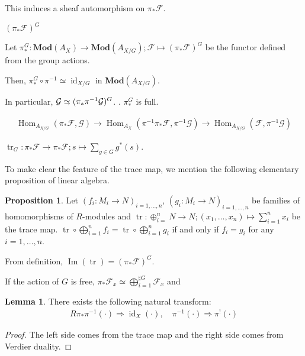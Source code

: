\documentclass[a4paper,dvipdfmx,reqno,12pt]{amsart}
\theoremstyle{definition}
\newtheorem{Prop}[Thm]{Proposition}
\newtheorem{Lem}[Thm]{Lemma}
\newcommand{\mcal}[1]{\mathcal{#1}}%
\newcommand{\opn}[1]{\operatorname{#1}}
\newcommand{\catn}[1]{\mathbf{#1}}
\newcommand{\simto}{ 
\mathrel{\raisebox{0.13em}{${\sim}$}}
\kern -0.75em \mathrel{\raisebox{-0.11em}{${\scriptstyle \to}$}}  
}
\numberwithin{equation}{section}
\begin{document}
This induces a sheaf automorphism on $\pi_*\mcal{F}$.

$(\pi_*\mcal{F})^{G}$


Let $\pi_{*}^{G}: \catn{Mod}(A_X)\to \catn{Mod}(A_{X/G});
  \mcal{F}\mapsto (\pi_*\mcal{F})^{G}$
be the functor defined from the group actions.

Then, $\pi_*^{G}\circ \pi^{-1}\simeq \opn{id}_{X/G}$
in  $\catn{Mod}(A_{X/G})$.





In particular, $\mcal{G}\simto(\pi_*\pi^{-1}\mcal{G})^{G}$.
\cite[Theorem 19.1]{bredonSheafTheory1997a}.
$\pi_*^{G}$ is full.



\begin{align}
  \opn{Hom}_{A_{X/G}}(\pi_*\mcal{F},\mcal{G})\to
  \opn{Hom}_{A_{X}}(\pi^{-1}\pi_*\mcal{F},\pi^{-1}\mcal{G}) \to
  \opn{Hom}_{A_{X/G}}(\mcal{F},\pi^{-1}\mcal{G})
\end{align}

$\opn{tr}_{G}:\pi_*\mcal{F}\to \pi_*\mcal{F};
  s \mapsto \sum_{g\in G}g^{*}(s)$.

To make clear the feature of the trace map, we mention the
following elementary proposition of linear algebra.

\begin{Prop}
  Let $(f_i:M_i \to N)_{i=1,\ldots,n}$,
  $(g_i:M_i \to N)_{i=1,\ldots,n}$ be families of
  homomorphisms of
  $R$-modules and $\opn{tr}:\oplus_{i=}^{n}N \to N;
    (x_1,\ldots,x_n)\mapsto \sum_{i=1}^{n}x_i$ be the trace map.
  $\opn{tr}\circ \bigoplus_{i=1}^{n} f_i=\opn{tr}\circ \bigoplus_{i=1}^{n}g_i$ if
  and only if $f_i=g_i$ for any $i=1,\ldots,n$.
\end{Prop}


From definition, $\opn{Im}(\opn{tr})=(\pi_*\mcal{F})^{G}$.


If the action of $G$ is free,
$\pi_*\mcal{F}_x\simeq \bigoplus_{i=1}^{\sharp G}\mcal{F}_x$
and

\begin{Lem}
  There exists the following natural transform:
  \begin{align}
    R\pi_*\pi^{-1}(\cdot)\Rightarrow \opn{id}_X(\cdot),\quad
    \pi^{-1}(\cdot) \Rightarrow \pi^{!}(\cdot)
  \end{align}
\end{Lem}
\begin{proof}
  The left side comes from the trace map and the right side
  comes from Verdier duality.
\end{proof}
\end{document}
